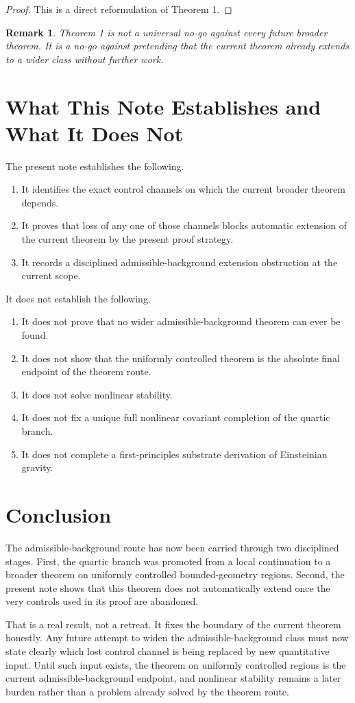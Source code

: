 \documentclass[11pt]{article}
\newtheorem{remark}{Remark}
\begin{document}
\begin{proof}
This is a direct reformulation of Theorem 1.
\end{proof}

\begin{remark}
Theorem 1 is not a universal no-go against every future broader theorem. It is a no-go against pretending that the current theorem already extends to a wider class without further work.
\end{remark}

\section{What This Note Establishes and What It Does Not}

The present note establishes the following.
\begin{enumerate}
    \item It identifies the exact control channels on which the current broader theorem depends.
    \item It proves that loss of any one of those channels blocks automatic extension of the current theorem by the present proof strategy.
    \item It records a disciplined admissible-background extension obstruction at the current scope.
\end{enumerate}

It does not establish the following.
\begin{enumerate}
    \item It does not prove that no wider admissible-background theorem can ever be found.
    \item It does not show that the uniformly controlled theorem is the absolute final endpoint of the theorem route.
    \item It does not solve nonlinear stability.
    \item It does not fix a unique full nonlinear covariant completion of the quartic branch.
    \item It does not complete a first-principles substrate derivation of Einsteinian gravity.
\end{enumerate}

\section{Conclusion}

The admissible-background route has now been carried through two disciplined stages. First, the quartic branch was promoted from a local continuation to a broader theorem on uniformly controlled bounded-geometry regions. Second, the present note shows that this theorem does not automatically extend once the very controls used in its proof are abandoned.

That is a real result, not a retreat. It fixes the boundary of the current theorem honestly. Any future attempt to widen the admissible-background class must now state clearly which lost control channel is being replaced by new quantitative input. Until such input exists, the theorem on uniformly controlled regions is the current admissible-background endpoint, and nonlinear stability remains a later burden rather than a problem already solved by the theorem route.
\end{document}
